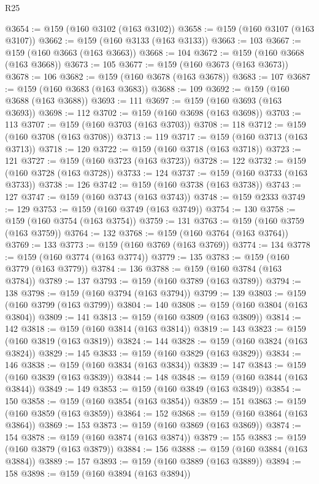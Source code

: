 \begin{lexlean}{R25}
\begin{coremodule}
@3654 := @159 (@160 @3102 (@163 @3102))
@3658 := @159 (@160 @3107 (@163 @3107))
@3662 := @159 (@160 @3133 (@163 @3133))
@3663 := 103
@3667 := @159 (@160 @3663 (@163 @3663))
@3668 := 104
@3672 := @159 (@160 @3668 (@163 @3668))
@3673 := 105
@3677 := @159 (@160 @3673 (@163 @3673))
@3678 := 106
@3682 := @159 (@160 @3678 (@163 @3678))
@3683 := 107
@3687 := @159 (@160 @3683 (@163 @3683))
@3688 := 109
@3692 := @159 (@160 @3688 (@163 @3688))
@3693 := 111
@3697 := @159 (@160 @3693 (@163 @3693))
@3698 := 112
@3702 := @159 (@160 @3698 (@163 @3698))
@3703 := 113
@3707 := @159 (@160 @3703 (@163 @3703))
@3708 := 118
@3712 := @159 (@160 @3708 (@163 @3708))
@3713 := 119
@3717 := @159 (@160 @3713 (@163 @3713))
@3718 := 120
@3722 := @159 (@160 @3718 (@163 @3718))
@3723 := 121
@3727 := @159 (@160 @3723 (@163 @3723))
@3728 := 122
@3732 := @159 (@160 @3728 (@163 @3728))
@3733 := 124
@3737 := @159 (@160 @3733 (@163 @3733))
@3738 := 126
@3742 := @159 (@160 @3738 (@163 @3738))
@3743 := 127
@3747 := @159 (@160 @3743 (@163 @3743))
@3748 := @159 @2333
@3749 := 129
@3753 := @159 (@160 @3749 (@163 @3749))
@3754 := 130
@3758 := @159 (@160 @3754 (@163 @3754))
@3759 := 131
@3763 := @159 (@160 @3759 (@163 @3759))
@3764 := 132
@3768 := @159 (@160 @3764 (@163 @3764))
@3769 := 133
@3773 := @159 (@160 @3769 (@163 @3769))
@3774 := 134
@3778 := @159 (@160 @3774 (@163 @3774))
@3779 := 135
@3783 := @159 (@160 @3779 (@163 @3779))
@3784 := 136
@3788 := @159 (@160 @3784 (@163 @3784))
@3789 := 137
@3793 := @159 (@160 @3789 (@163 @3789))
@3794 := 138
@3798 := @159 (@160 @3794 (@163 @3794))
@3799 := 139
@3803 := @159 (@160 @3799 (@163 @3799))
@3804 := 140
@3808 := @159 (@160 @3804 (@163 @3804))
@3809 := 141
@3813 := @159 (@160 @3809 (@163 @3809))
@3814 := 142
@3818 := @159 (@160 @3814 (@163 @3814))
@3819 := 143
@3823 := @159 (@160 @3819 (@163 @3819))
@3824 := 144
@3828 := @159 (@160 @3824 (@163 @3824))
@3829 := 145
@3833 := @159 (@160 @3829 (@163 @3829))
@3834 := 146
@3838 := @159 (@160 @3834 (@163 @3834))
@3839 := 147
@3843 := @159 (@160 @3839 (@163 @3839))
@3844 := 148
@3848 := @159 (@160 @3844 (@163 @3844))
@3849 := 149
@3853 := @159 (@160 @3849 (@163 @3849))
@3854 := 150
@3858 := @159 (@160 @3854 (@163 @3854))
@3859 := 151
@3863 := @159 (@160 @3859 (@163 @3859))
@3864 := 152
@3868 := @159 (@160 @3864 (@163 @3864))
@3869 := 153
@3873 := @159 (@160 @3869 (@163 @3869))
@3874 := 154
@3878 := @159 (@160 @3874 (@163 @3874))
@3879 := 155
@3883 := @159 (@160 @3879 (@163 @3879))
@3884 := 156
@3888 := @159 (@160 @3884 (@163 @3884))
@3889 := 157
@3893 := @159 (@160 @3889 (@163 @3889))
@3894 := 158
@3898 := @159 (@160 @3894 (@163 @3894))

\end{coremodule}
\end{lexlean}

